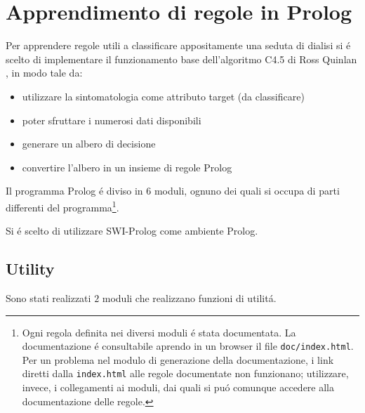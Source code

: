 \documentclass[preprint]{acm_proc_article-sp}
\begin{document}
\section{Apprendimento di regole in Prolog}
\label{prolog}
Per apprendere regole utili a classificare appositamente una seduta di dialisi si \'e scelto di implementare il funzionamento base dell'algoritmo C4.5 di Ross Quinlan \cite{Quinlan:1993:CPM:583200} \cite{Salzberg:1994:BRC:198277.637825}, in modo tale da:
\begin{itemize}
\item utilizzare la sintomatologia come attributo target (da classificare)
\item poter sfruttare i numerosi dati disponibili
\item generare un albero di decisione
\item convertire l'albero in un insieme di regole Prolog
\end{itemize}

Il programma Prolog \'e diviso in $6$ moduli, ognuno dei quali si occupa di parti differenti del programma\footnote{Ogni regola definita nei diversi moduli \'e stata documentata. La documentazione \'e consultabile aprendo in un browser il file \texttt{doc/index.html}. Per un problema nel modulo di generazione della documentazione, i link diretti dalla \texttt{index.html} alle regole documentate non funzionano; utilizzare, invece, i collegamenti ai moduli, dai quali si pu\'o comunque accedere alla documentazione delle regole.}.

Si \'e scelto di utilizzare SWI-Prolog\cite{SWI:2014:Online} come ambiente Prolog.

\subsection{Utility}
\label{prolog-utility}
Sono stati realizzati $2$ moduli che realizzano funzioni di utilit\'a.
\end{document}
